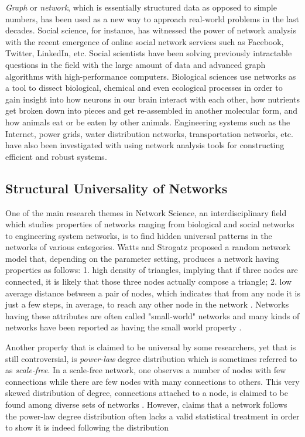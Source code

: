 \documentclass{article}
\begin{document}
	\textit{Graph} or \textit{network}, which is essentially structured data as opposed to simple numbers, has been used as a new way to approach real-world problems in the last decades. Social science, for instance, has witnessed the power of network analysis with the recent emergence of online social network services such as Facebook, Twitter, LinkedIn, etc.  Social scientists have been solving previously intractable questions in the field with the large amount of  data and advanced graph algorithms with high-performance computers. Biological sciences use networks as a tool to dissect biological, chemical and even ecological processes in order to gain insight into how neurons in our brain interact with each other, how nutrients get broken down into pieces and get re-assembled in another molecular form, and how animals eat or be eaten by other animals. Engineering systems such as the Internet, power grids, water distribution networks, transportation networks, etc. have also been investigated with using network analysis tools for constructing efficient and robust systems. 
	
	
	\subsection{Structural Universality of Networks}
	
	One of the main research themes in Network Science, an interdisciplinary field which studies properties of networks ranging from biological and social networks to engineering system networks, is to find hidden universal patterns in the networks of various categories. 
	Watts and Strogatz proposed a random network model that, depending on the parameter setting, produces a network having properties as follows: 1. high density of triangles, implying that if three nodes are connected, it is likely that those three nodes actually compose a triangle; 2. low average distance between a pair of nodes, which indicates that from any node it is just a few steps, in average, to reach any other node in the network \cite{watts1998cds}. Networks having these attributes are often called "small-world" networks and many kinds of networks have been reported as having the small world property \cite{Network_Small-World-Ness}.

	
	
	 Another property that is claimed to be universal by some researchers, yet that is still controversial, is \textit{power-law} degree distribution which is sometimes referred to as \textit{scale-free}. In a scale-free network, one observes a number of nodes with few connections while there are few nodes with many connections to others. This very skewed distribution of degree, connections attached to a node, is claimed to be found among diverse sets of networks \cite{Barabasi99emergenceScaling}. However, claims that a network follows the power-law degree distribution often lacks a valid statistical treatment in order to show it is indeed following the distribution \cite{Clauset:PowerLaw}
\end{document}

